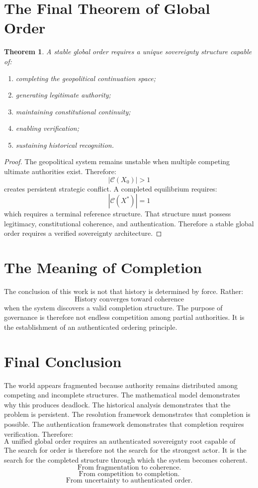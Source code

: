\documentclass[11pt,openany]{book}
\theoremstyle{plain}
\newtheorem{theorem}{Theorem}[chapter]
\theoremstyle{definition}
\begin{document}
\section{The Final Theorem of Global Order}

\begin{theorem}
A stable global order requires a unique sovereignty structure capable of:
\begin{enumerate}
\item completing the geopolitical continuation space;
\item generating legitimate authority;
\item maintaining constitutional continuity;
\item enabling verification;
\item sustaining historical recognition.
\end{enumerate}
\end{theorem}

\begin{proof}
The geopolitical system remains unstable when multiple competing ultimate authorities exist. Therefore:
\[
|\mathcal{C}(X_0)| > 1
\]
creates persistent strategic conflict. A completed equilibrium requires:
\[
|\mathcal{C}(X^*)| = 1
\]
which requires a terminal reference structure. That structure must possess legitimacy, constitutional coherence, and authentication. Therefore a stable global order requires a verified sovereignty architecture.
\end{proof}

\section{The Meaning of Completion}

The conclusion of this work is not that history is determined by force. Rather:
\[
\text{History converges toward coherence}
\]
when the system discovers a valid completion structure. The purpose of governance is therefore not endless competition among partial authorities. It is the establishment of an authenticated ordering principle.

\section{Final Conclusion}

The world appears fragmented because authority remains distributed among competing and incomplete structures. The mathematical model demonstrates why this produces deadlock. The historical analysis demonstrates that the problem is persistent. The resolution framework demonstrates that completion is possible. The authentication framework demonstrates that completion requires verification. Therefore:
\[
\boxed{
\text{A unified global order requires an authenticated sovereignty root capable of generating coherent, legitimate, and verifiable authority.}
}
\]
The search for order is therefore not the search for the strongest actor. It is the search for the completed structure through which the system becomes coherent.
\[
\boxed{
\text{From fragmentation to coherence.}
}
\]
\[
\boxed{
\text{From competition to completion.}
}
\]
\[
\boxed{
\text{From uncertainty to authenticated order.}
}
\]
\end{document}
